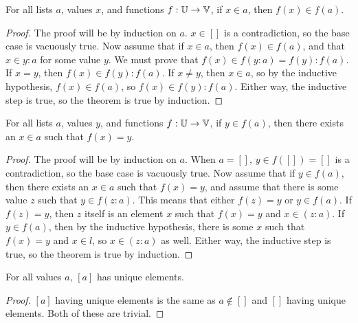 \documentclass[../../math.tex]{subfiles}
\begin{document}
\begin{theorem} \label{in_list_image}
    For all lists $a$, values $x$, and functions $f : \mathbb{U} \to \mathbb{V}$, if $x \in a$,
    then $f(x) \in f(a)$.
\end{theorem}
\begin{proof}
    The proof will be by induction on $a$.  $x \in []$ is a contradiction, so
    the base case is vacuously true.  Now assume that if $x \in a$, then $f(x)
    \in f(a)$, and that $x \in y : a$ for some value $y$.  We must prove that
    $f(x) \in f(y : a) = f(y) : f(a)$.  If $x = y$, then $f(x) \in f(y) : f(a)$.
    If $x \neq y$, then $x \in a$, so by the inductive hypothesis, $f(x) \in
    f(a)$, so $f(x) \in f(y) : f(a)$.  Either way, the inductive step is true,
    so the theorem is true by induction.
\end{proof}

\begin{theorem} \label{image_in_list}
    For all lists $a$, values $y$, and functions $f : \mathbb{U} \to \mathbb{V}$, if $y \in
    f(a)$, then there exists an $x \in a$ such that $f(x) = y$.
\end{theorem}
\begin{proof}
    The proof will be by induction on $a$.  When $a = []$, $y \in f([]) = []$ is
    a contradiction, so the base case is vacuously true.  Now assume that if $y
    \in f(a)$, then there exists an $x \in a$ such that $f(x) = y$, and assume
    that there is some value $z$ such that $y \in f(z : a)$.  This means that
    either $f(z) = y$ or $y \in f(a)$.  If $f(z) = y$, then $z$ itself is an
    element $x$ such that $f(x) = y$ and $x \in (z : a)$.  If $y \in f(a)$, then
    by the inductive hypothesis, there is some $x$ such that $f(x) = y$ and $x
    \in l$, so $x \in (z : a)$ as well.  Either way, the inductive step is true,
    so the theorem is true by induction.
\end{proof}

\begin{theorem}
    For all values $a$, $[a]$ has unique elements.
\end{theorem}
\begin{proof}
    $[a]$ having unique elements is the same as $a \notin []$ and $[]$ having
    unique elements.  Both of these are trivial.
\end{proof}
\end{document}
